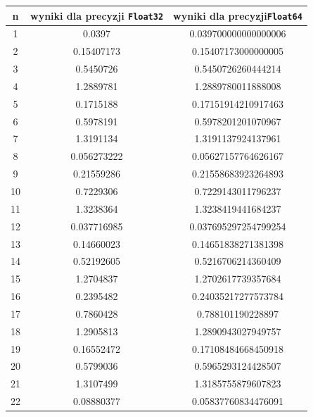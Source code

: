 \documentclass{article}
\begin{document}
\begin{table}[H]
\centering
\begin{tabular}{|c|c|c|}
\hline
\textbf{n} & wyniki dla precyzji \texttt{Float32}        & wyniki dla precyzji\texttt{Float64}               \\ \hline
1          & 0.0397            & 0.039700000000000006      \\ \hline
2          & 0.15407173        & 0.15407173000000005       \\ \hline
3          & 0.5450726         & 0.5450726260444214        \\ \hline
4          & 1.2889781         & 1.2889780011888008        \\ \hline
5          & 0.1715188         & 0.17151914210917463       \\ \hline
6          & 0.5978191         & 0.5978201201070967        \\ \hline
7          & 1.3191134         & 1.3191137924137961        \\ \hline
8          & 0.056273222       & 0.05627157764626167       \\ \hline
9          & 0.21559286        & 0.21558683923264893       \\ \hline
10         & 0.7229306         & 0.7229143011796237        \\ \hline
11         & 1.3238364         & 1.3238419441684237        \\ \hline
12         & 0.037716985       & 0.037695297254799254      \\ \hline
13         & 0.14660023        & 0.14651838271381398       \\ \hline
14         & 0.52192605        & 0.5216706214360409        \\ \hline
15         & 1.2704837         & 1.2702617739357684        \\ \hline
16         & 0.2395482         & 0.24035217277573784       \\ \hline
17         & 0.7860428         & 0.788101190228897         \\ \hline
18         & 1.2905813         & 1.2890943027949757        \\ \hline
19         & 0.16552472        & 0.17108484668450918       \\ \hline
20         & 0.5799036         & 0.5965293124428507        \\ \hline
21         & 1.3107499         & 1.3185755879607823        \\ \hline
22         & 0.08880377        & 0.05837760834476091       \\ \hline

\end{tabular}
\end{table}
\end{document}
